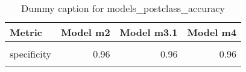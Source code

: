 \begin{table}
\centering
\caption{Dummy caption for models_postclass_accuracy}
\centering
\fontsize{10}{12}\selectfont
\begin{tabular}[t]{lrrr}
\toprule
Metric & Model m2 & Model m3.1 & Model m4\\
\midrule
\cellcolor{gray!10}{sensitivity} & \cellcolor{gray!10}{0.44} & \cellcolor{gray!10}{0.44} & \cellcolor{gray!10}{0.44}\\
specificity & 0.96 & 0.96 & 0.96\\
\cellcolor{gray!10}{overall\_accuracy} & \cellcolor{gray!10}{0.74} & \cellcolor{gray!10}{0.75} & \cellcolor{gray!10}{0.75}\\
\bottomrule
\end{tabular}
\end{table}
